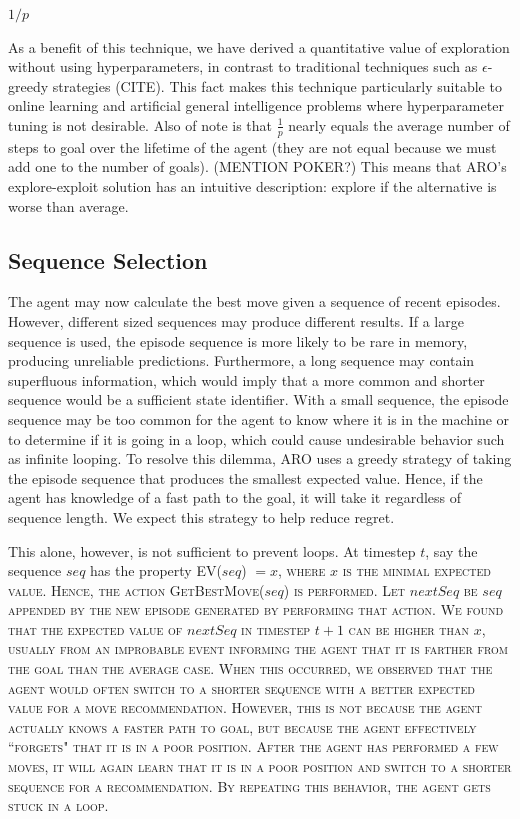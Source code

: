 \documentclass[letterpaper]{article} %
\begin{document}
\begin{algorithmic}[-1]
	
		\State \Return $1/p$
	\EndFunction
	
\end{algorithmic}

As a benefit of this technique, we have derived a quantitative value of exploration without using hyperparameters, in contrast to traditional techniques such as $\epsilon$-greedy strategies (CITE). This fact makes this technique particularly suitable to online learning and artificial general intelligence problems where hyperparameter tuning is not desirable. Also of note is that $\frac{1}{p}$ nearly equals the average number of steps to goal over the lifetime of the agent (they are not equal because we must add one to the number of goals). (MENTION POKER?) This means that ARO's explore-exploit solution has an intuitive description: explore if the alternative is worse than average.

\subsection{Sequence Selection}

The agent may now calculate the best move given a sequence of recent episodes. However, different sized sequences may produce different results. If a large sequence is used, the episode sequence is more likely to be rare in memory, producing unreliable predictions. Furthermore, a long sequence may contain superfluous information, which would imply that a more common and shorter sequence would be a sufficient state identifier. With a small sequence, the episode sequence may be too common for the agent to know where it is in the machine or to determine if it is going in a loop, which could cause undesirable behavior such as infinite looping. To resolve this dilemma, ARO uses a greedy strategy of taking the episode sequence that produces the smallest expected value. Hence, if the agent has knowledge of a fast path to the goal, it will take it regardless of sequence length. We expect this strategy to help reduce regret.

This alone, however, is not sufficient to prevent loops. At timestep $t$, say the sequence $seq$ has the property \scshape EV\normalfont($seq$) $ = x$, where $x$ is the minimal expected value. Hence, the action \scshape GetBestMove\normalfont($seq$) is performed. Let $nextSeq$ be $seq$ appended by the new episode generated by performing that action. We found that the expected value of $nextSeq$ in timestep $t+ 1$ can be higher than $x$, usually from an improbable event informing the agent that it is farther from the goal than the average case. When this occurred, we observed that the agent would often switch to a shorter sequence with a better expected value for a move recommendation. However, this is not because the agent actually knows a faster path to goal, but because the agent effectively ``forgets" that it is in a poor position. After the agent has performed a few moves, it will again learn that it is in a poor position and switch to a shorter sequence for a recommendation. By repeating this behavior, the agent gets stuck in a loop. 
\end{document}
